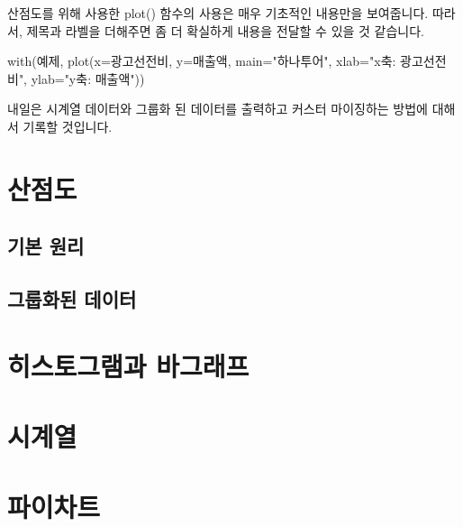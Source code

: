 산점도를 위해 사용한 plot() 함수의 사용은 매우 기초적인 내용만을 보여줍니다. 
따라서, 제목과 라벨을 더해주면 좀 더 확실하게 내용을 전달할 수 있을 것 같습니다. 

\begin{Schunk}
\begin{Soutput}
with(예제, plot(x=광고선전비, y=매출액, main="하나투어", xlab="x축: 광고선전비", ylab="y축: 매출액"))
\end{Soutput}
\end{Schunk}

내일은 시계열 데이터와 그룹화 된 데이터를 출력하고 커스터 마이징하는 방법에 대해서 기록할 것입니다.

\section{산점도}

\subsection{기본 원리}

\subsection{그룹화된 데이터}


\section{히스토그램과 바그래프}


\section{시계열}


\section{파이차트}

